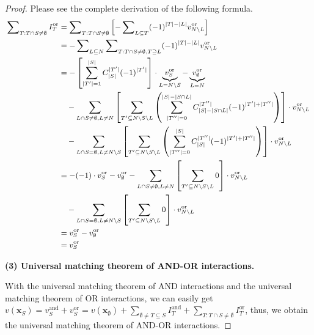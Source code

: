 \documentclass[10pt,twocolumn,letterpaper]{article}
\begin{document}
\begin{proof}
Please see the complete derivation of the following formula.
\begin{equation}\begin{small}
\begin{aligned}
\sum\nolimits_{T:T \cap S \neq \emptyset} I^{\text{or}}_T
        &= \sum\nolimits_{T:T \cap S \neq \emptyset} \left[- \sum\nolimits_{L \subseteq T} (-1)^{\vert T \vert - \vert L \vert} v^{\text{or}}_{N \setminus L} \right]\\
        &= - \sum\nolimits_{L \subseteq N} \sum\nolimits_{T: T \cap S \neq \emptyset, T \supseteq L} (-1)^{\vert T \vert - \vert L \vert} v^{\text{or}}_{N \setminus L} \\
        &=  - \left[\sum_{\vert T' \vert = 1}^{\vert S \vert} C_{\vert S \vert}^{\vert T' \vert} (-1)^{\vert T' \vert} \right] \cdot \underbrace{v^{\text{or}}_S}_{L=N\setminus S} - \underbrace{v^{\text{or}}_\emptyset}_{L=N} \\
        &\quad- \sum_{L \cap S \neq \emptyset, L \neq N} \left[\sum_{T' \subseteq N\setminus S \setminus L} \left( \sum_{\vert T'' \vert = 0}^{\vert S \vert-\vert S \cap L \vert} C_{\vert S \vert - \vert S \cap L \vert}^{\vert T''\vert } (-1)^{\vert T' \vert + \vert T'' \vert} \right) \right]\cdot v^{\text{or}}_{N \setminus L}  \\
        &\quad- \sum_{L \cap S=\emptyset, L \neq N \setminus S} \left[ \sum_{T' \subseteq N\setminus S \setminus L} \left( \sum_{\vert T'' \vert=0}^{\vert S \vert} C_{\vert S \vert}^{\vert T'' \vert} (-1)^{\vert T' \vert + \vert T'' \vert}\right) \right] \cdot v^{\text{or}}_{N \setminus L}  \\
        &=  - (-1) \cdot v^{\text{or}}_S - v^{\text{or}}_\emptyset - \sum_{L \cap S \neq \emptyset, L \neq N} \left[\sum_{T' \subseteq N\setminus S \setminus L} 0 \right]\cdot v^{\text{or}}_{N \setminus L}  \\
        &\quad- \sum_{L \cap S=\emptyset, L \neq N \setminus S}\left[\sum_{T' \subseteq N\setminus S \setminus L} 0 \right] \cdot v^{\text{or}}_{N \setminus L}  \\
        &= v^{\text{or}}_S - v^{\text{or}}_\emptyset\\
        &= v^{\text{or}}_S
\end{aligned} \end{small}
\end{equation}

\textbf{(3) Universal matching theorem of AND-OR interactions.}

With the universal matching theorem of AND interactions and the universal matching theorem of OR interactions, we can easily get \( v(\mathbf{x}_S) = v^{\text{and}}_S + v^{\text{or}}_S
= v(\mathbf{x}_\emptyset) + \sum_{\emptyset \neq T\subseteq S} I^{\text{and}}_T + \sum_{T: T\cap S \neq \emptyset} I^{\text{or}}_T \), thus, we obtain the universal matching theorem of AND-OR interactions.

\end{proof}
\end{document}
